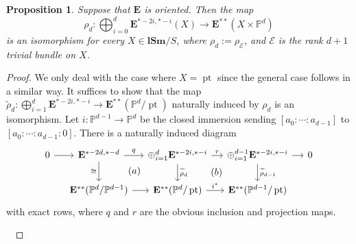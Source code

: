 \documentclass[11pt, a4paper]{amsart}
\newtheorem{prop}[thm]{Proposition}
\theoremstyle{definition}
\numberwithin{equation}{subsection}
\renewcommand{\P}{\mathbb{P}}
\newcommand{\lSm}{\mathbf{lSm}}
\newcommand{\pt}[1]{\mathrm{\pt}_{#1}}
\newcommand{\cE}{\mathcal{E}}
\def\pt{\operatorname{pt}}
\newcommand{\ringE}{\mathbf{E}}
\begin{document}
\begin{prop}
\label{Ori.51}
Suppose that $\ringE$ is oriented.
Then the map
\[
\rho_d
\colon
\bigoplus_{i=0}^d
\ringE^{*-2i,*-i}(X)
\to
\ringE^{**}(X\times \P^d)
\]
is an isomorphism for every $X\in \lSm/S$, where $\rho_d:=\rho_{\cE}$, and $\cE$ is the rank $d+1$ trivial bundle on $X$.
\end{prop}
\begin{proof}
We only deal with the case where $X=\pt$ since the general case follows in a similar way.
It suffices to show that the map
$
\widetilde{\rho}_d
\colon
\bigoplus_{i=1}^d
\ringE^{*-2i,*-i}
\to
\ringE^{**}(\P^d/\pt)
$
naturally induced by $\rho_d$ is an isomorphism.
Let $i\colon \P^{d-1}\to \P^d$ be the closed immersion sending $[a_0:\cdots:a_{d-1}]$ to $[a_0:\cdots:a_{d-1}:0]$.
There is a naturally induced diagram
\begin{equation}
\label{Ori.11.3}
\begin{tikzcd}[column sep=small]
0\ar[r]&
\ringE^{*-2d,*-d}\ar[d,"\cong"']\ar[r,"q"]\ar[rd,phantom,"(a)" description]&
\oplus_{i=1}^d \ringE^{*-2i,*-i}\ar[d,"\widetilde{\rho}_d"]\ar[r,"r"]\ar[rd,phantom,"(b)" description]&
\oplus_{i=1}^{d-1} \ringE^{*-2i,*-i}\ar[d,"\widetilde{\rho}_{d-1}"]\ar[r]&
0
\\
&
\ringE^{**}(\P^d/\P^{d-1})\ar[r]&
\ringE^{**}(\P^d/\pt)\ar[r,"i^*"]&
\ringE^{**}(\P^{d-1}/\pt)
\end{tikzcd}
\end{equation}
with exact rows, where $q$ and $r$ are the obvious inclusion and projection maps.

\


\end{proof}
\end{document}
